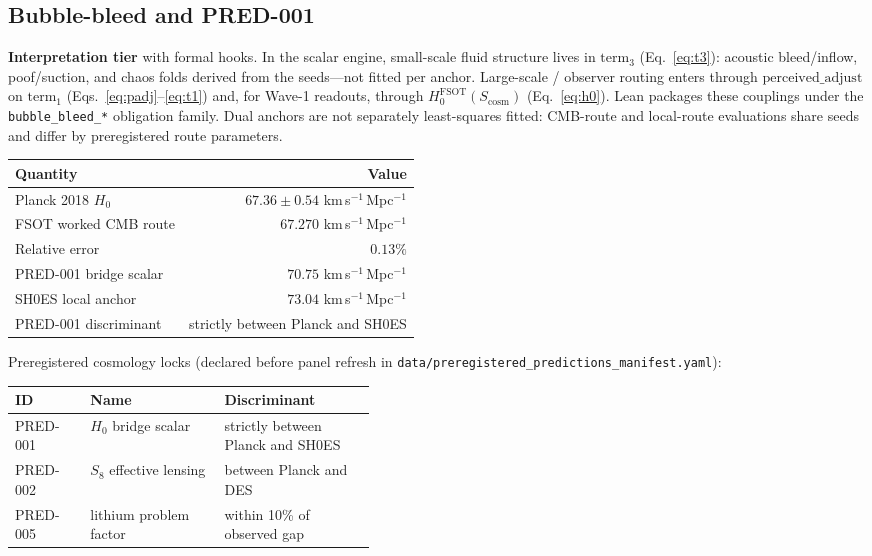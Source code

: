 \documentclass[11pt,a4paper]{article}
\begin{document}
\subsection{Bubble-bleed and PRED-001}

\textbf{Interpretation tier} with formal hooks.
In the scalar engine, small-scale fluid structure lives in $\mathrm{term}_3$
(Eq.~\eqref{eq:t3}): acoustic bleed/inflow, poof/suction, and chaos folds
derived from the seeds---not fitted per anchor.
Large-scale / observer routing enters through $\mathrm{perceived\_adjust}$ on
$\mathrm{term}_1$ (Eqs.~\eqref{eq:padj}--\eqref{eq:t1}) and, for Wave-1
readouts, through $H_0^{\mathrm{FSOT}}(S_{\mathrm{cosm}})$
(Eq.~\eqref{eq:h0}).
Lean packages these couplings under the \texttt{bubble\_bleed\_*} obligation
family.
Dual anchors are not separately least-squares fitted: CMB-route and local-route
evaluations share seeds and differ by preregistered route parameters.

\begin{center}
\begin{tabular}{@{}lr@{}}
\toprule
Quantity & Value \\
\midrule
Planck 2018 $H_0$ & $67.36\pm 0.54$ km\,s$^{-1}$\,Mpc$^{-1}$ \\
FSOT worked CMB route & $67.270$ km\,s$^{-1}$\,Mpc$^{-1}$ \\
Relative error & $0.13\%$ \\
PRED-001 bridge scalar & $70.75$ km\,s$^{-1}$\,Mpc$^{-1}$ \\
SH0ES local anchor & $73.04$ km\,s$^{-1}$\,Mpc$^{-1}$ \\
PRED-001 discriminant & strictly between Planck and SH0ES \\
\bottomrule
\end{tabular}
\end{center}

Preregistered cosmology locks (declared before panel refresh in
\texttt{data/preregistered\_predictions\_manifest.yaml}):

\begin{center}
\begin{tabular}{@{}llp{0.42\linewidth}@{}}
\toprule
ID & Name & Discriminant \\
\midrule
PRED-001 & $H_0$ bridge scalar & strictly between Planck and SH0ES \\
PRED-002 & $S_8$ effective lensing & between Planck and DES \\
PRED-005 & lithium problem factor & within 10\% of observed gap \\
\bottomrule
\end{tabular}
\end{center}
\end{document}
